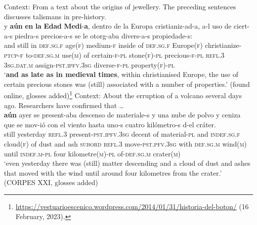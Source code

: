 \begin{exe}

	\ex\label{appendixSpanishAunTimeScalar1}
	Context: From a text about the origins of jewellery. The preceding sentences discusses talismans in pre-history.\\
	\gll y \textbf{aún} \textbf{en} \textbf{la} \textbf{Edad} \textbf{Medi}-\textbf{a}, dentro de la Europa cristianiz-ad-a, a-l uso de ciert-a-s piedra-s precios-a-s se le otorg-aba divers-a-s propiedade-s:\\
	and still in \textsc{def}.\textsc{sg}.\textsc{f} age(\textsc{f}) medium-\textsc{f} inside of \textsc{def}.\textsc{sg}.\textsc{f} Europe(\textsc{f}) christianize-\textsc{ptcp}-\textsc{f} to-\textsc{def}.\textsc{sg}.\textsc{m} use(\textsc{m}) of certain-\textsc{f}-\textsc{pl} stone(\textsc{f})-\textsc{pl} precious-\textsc{f}-\textsc{pl} \textsc{refl}.3 3\textsc{sg}.\textsc{dat}.\textsc{m} assign-\textsc{pst}.\textsc{ipfv}.3\textsc{sg} diverse-\textsc{f}-\textsc{pl} property(\textsc{f})-\textsc{pl}\\
	\glt \lq \textbf{and as late as in medieval times}, within christianised Europe, the use of certain precious stones was (still) associated with a number of properties.\rq{ }(found online, glosses added)\footnote{\url{https://vestuarioescenico.wordpress.com/2014/01/31/historia-del-boton/} (16 February, 2023).}
	\largerpage[-1]\pagebreak
	\ex\label{appendixSpanishAunTimeScalar2}
	Context: About the erruption of a volcano several days ago. Researchers have confirmed that …\\
	\gll \textbf{aún} ayer se present-aba descenso de materiale-s y una nube de polvo y ceniza que se mov-ió con el viento hasta uno-s cuatro kilómetro-s d-el cráter.\\
still yesterday \textsc{refl}.3 present-\textsc{pst}.\textsc{ipfv}.3\textsc{sg} decent of material-\textsc{pl} and \textsc{indef}.\textsc{sg}.\textsc{f} cloud(\textsc{f}) of dust and ash \textsc{subord} \textsc{refl}.3 move-\textsc{pst}.\textsc{pfv}.3\textsc{sg} with \textsc{def}.\textsc{sg}.\textsc{m} wind(\textsc{m}) until \textsc{indef}.\textsc{m}-\textsc{pl} four kilometre(\textsc{m})-\textsc{pl} of-\textsc{def}.\textsc{sg}.\textsc{m} crater(\textsc{m})\\
	\glt \lq even yesterday there was (still) matter descending and a cloud of dust and ashes that moved with the wind until around four kilometres from the crater.\rq{ }(CORPES XXI, glosses added)
	

\end{exe}
